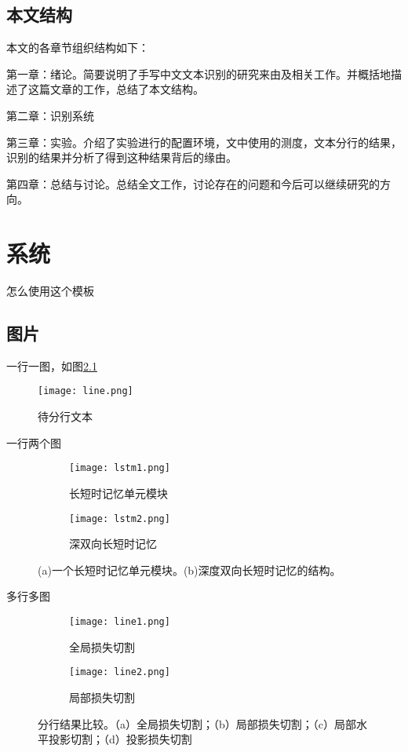 \documentclass[winfonts, thesis]{njuthesis}
\begin{document}
\begin{spacing}{1.625}
\begin{enumerate}
\end{enumerate}
\section{本文结构}
本文的各章节组织结构如下：

第一章：绪论。简要说明了手写中文文本识别的研究来由及相关工作。并概括地描述了这篇文章的工作，总结了本文结构。

第二章：识别系统

第三章：实验。介绍了实验进行的配置环境，文中使用的测度，文本分行的结果，识别的结果并分析了得到这种结果背后的缘由。

第四章：总结与讨论。总结全文工作，讨论存在的问题和今后可以继续研究的方向。

\chapter{系统}\label{chapter_system}

怎么使用这个模板

\section{图片}

一行一图，如图\ref{fig:line}
\begin{figure}[htbp]
   \centering
   \texttt{[image: line.png]} %
   \caption{待分行文本}
   \label{fig:line}
\end{figure}


一行两个图
\begin{figure}[ht!]
    \centering
    \begin{subfigure}{.5\textwidth}
    	\centering
        \texttt{[image: lstm1.png]}
        \caption{长短时记忆单元模块}
    \end{subfigure}
    \begin{subfigure}{.4\textwidth}
    	\centering
        \texttt{[image: lstm2.png]}
        \caption{深双向长短时记忆}
        \label{fig:lstm2}
    \end{subfigure}
    \caption{(a)一个长短时记忆单元模块。(b)深度双向长短时记忆的结构。}
\label{fig:lstm}
\end{figure}

多行多图
\begin{figure}[ht!]
    \centering
    \begin{subfigure}{\textwidth}
        \centering
        \texttt{[image: line1.png]}
        \caption{全局损失切割}
        \label{fig:line1}
    \end{subfigure}
    \begin{subfigure}{\textwidth}
    	\centering
        \texttt{[image: line2.png]}
        \caption{局部损失切割}
        \label{fig:line2}
    \end{subfigure}
    \caption{分行结果比较。（a）全局损失切割；（b）局部损失切割；（c）局部水平投影切割；（d）投影损失切割}
\end{figure}


\end{spacing}
\end{document}
